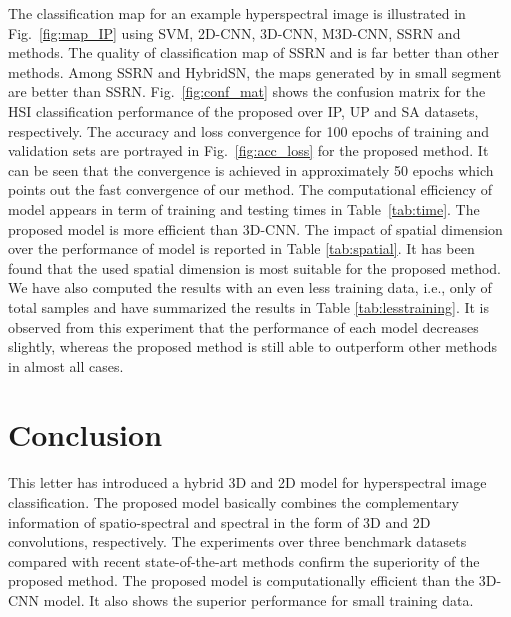 \documentclass[journal]{IEEEtran}
\begin{document}
The classification map for an example hyperspectral image is illustrated in Fig.~\ref{fig:map_IP} using SVM, 2D-CNN, 3D-CNN, M3D-CNN, SSRN and  methods. The quality of classification map of SSRN and  is far better than other methods. Among SSRN and HybridSN, the maps generated by  in small segment are better than SSRN.
Fig.~\ref{fig:conf_mat} shows the confusion matrix for the HSI classification performance of the proposed  over IP, UP and SA datasets, respectively. The accuracy and loss convergence for 100 epochs of training and validation sets are portrayed in Fig.~\ref{fig:acc_loss} for the proposed method. It can be seen that the convergence is achieved in approximately 50 epochs which points out the fast convergence of our method. The computational efficiency of  model appears in term of training and testing times in Table~\ref{tab:time}. The proposed model is more efficient than 3D-CNN. The impact of spatial dimension over the performance of  model is reported in Table \ref{tab:spatial}. It has been found that the used  spatial dimension is most suitable for the proposed method. We have also computed the results with an even less training data, i.e., only  of total samples and have summarized the results in Table \ref{tab:lesstraining}. It is observed from this experiment that the performance of each model decreases slightly, whereas the proposed method is still able to outperform other methods in almost all cases.

\section{Conclusion}
This letter has introduced a hybrid 3D and 2D model for hyperspectral image classification. The proposed  model basically combines the complementary information of spatio-spectral and spectral in the form of 3D and 2D convolutions, respectively. The experiments over three benchmark datasets compared with recent state-of-the-art methods confirm the superiority of the proposed method. The proposed model is computationally efficient than the 3D-CNN model. It also shows the superior performance for small training data. 




\end{document}
